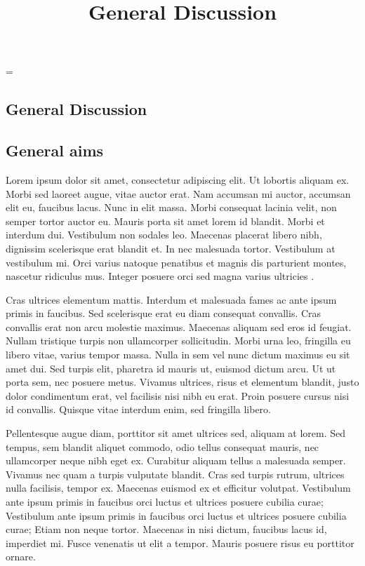 
\emergencystretch=\maxdimen
{}

\begin{refsection}

\title{General Discussion}

\chapter{General Discussion}

\vspace{-2cm}

\section{General aims}

Lorem ipsum dolor sit amet, consectetur adipiscing elit. Ut lobortis aliquam ex. Morbi sed laoreet augue, vitae auctor erat. Nam accumsan mi auctor, accumsan elit eu, faucibus lacus. Nunc in elit massa. Morbi consequat lacinia velit, non semper tortor auctor eu. Mauris porta sit amet lorem id blandit. Morbi et interdum dui. Vestibulum non sodales leo. Maecenas placerat libero nibh, dignissim scelerisque erat blandit et. In nec malesuada tortor. Vestibulum at vestibulum mi. Orci varius natoque penatibus et magnis dis parturient montes, nascetur ridiculus mus. Integer posuere orci sed magna varius ultricies \cite{example1}.

Cras ultrices elementum mattis. Interdum et malesuada fames ac ante ipsum primis in faucibus. Sed scelerisque erat eu diam consequat convallis. Cras convallis erat non arcu molestie maximus. Maecenas aliquam sed eros id feugiat. Nullam tristique turpis non ullamcorper sollicitudin. Morbi urna leo, fringilla eu libero vitae, varius tempor massa. Nulla in sem vel nunc dictum maximus eu sit amet dui. Sed turpis elit, pharetra id mauris ut, euismod dictum arcu. Ut ut porta sem, nec posuere metus. Vivamus ultrices, risus et elementum blandit, justo dolor condimentum erat, vel facilisis nisi nibh eu erat. Proin posuere cursus nisi id convallis. Quisque vitae interdum enim, sed fringilla libero.

Pellentesque augue diam, porttitor sit amet ultrices sed, aliquam at lorem. Sed tempus, sem blandit aliquet commodo, odio tellus consequat mauris, nec ullamcorper neque nibh eget ex. Curabitur aliquam tellus a malesuada semper. Vivamus nec quam a turpis vulputate blandit. Cras sed turpis rutrum, ultrices nulla facilisis, tempor ex. Maecenas euismod ex et efficitur volutpat. Vestibulum ante ipsum primis in faucibus orci luctus et ultrices posuere cubilia curae; Vestibulum ante ipsum primis in faucibus orci luctus et ultrices posuere cubilia curae; Etiam non neque tortor. Maecenas in nisi dictum, faucibus lacus id, imperdiet mi. Fusce venenatis ut elit a tempor. Mauris posuere risus eu porttitor ornare.


\end{refsection}
